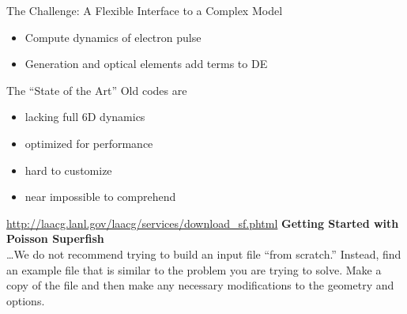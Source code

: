 \documentclass[mathserif]{beamer}
\begin{document}
%  

\begin{frame}{The Challenge: A Flexible Interface to a Complex Model}
  \begin{itemize}
    \item Compute dynamics of electron pulse
    \item Generation and optical elements add terms to DE
  \end{itemize}
\end{frame}

\begin{frame}{The ``State of the Art''}
  Old codes are
  \begin{itemize}
    \item lacking full 6D dynamics
    \item optimized for performance
    \item hard to customize
    \item near impossible to comprehend
  \end{itemize}
  \begin{block}{\url{http://laacg.lanl.gov/laacg/services/download_sf.phtml}}
    \textbf{Getting Started with Poisson Superfish}\\
    \ldots We do not recommend trying to build an input file ``from scratch.'' Instead, find an example file that is similar to the problem you are trying to solve. Make a copy of the file and then make any necessary modifications to the geometry and options.
  \end{block}
\end{frame}
\end{document}
